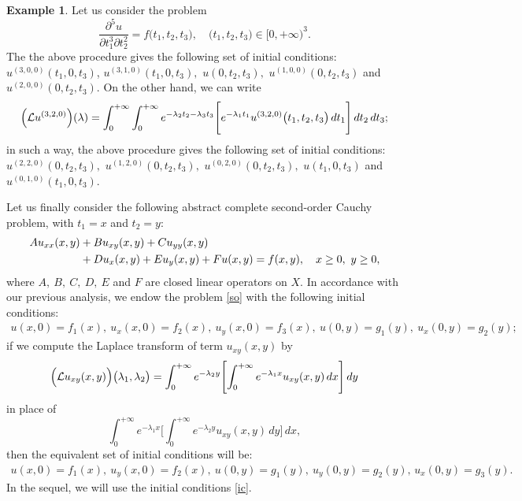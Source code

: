 \documentclass{amsart}
\theoremstyle{definition}
\newtheorem{example}[thm]{Example}
\theoremstyle{remark}
\numberwithin{equation}{section}
\begin{document}
\begin{example}\label{ill}
Let us consider the problem
$$
\frac{\partial^{5}u}{\partial t_{1}^{3}\partial t_{2}^{2}}=f\bigl(t_{1},t_{2},t_{3}\bigr),\quad \bigl(t_{1},t_{2},t_{3}\bigr) \in [0,+\infty)^{3}. 
$$
The the above procedure gives the following set of initial conditions: $u^{(3,0,0)}(t_{1},0,t_{3})$, $u^{(3,1,0)}(t_{1},0,t_{3}),$ $u(0,t_{2},t_{3}),$ $u^{(1,0,0)}(0,t_{2},t_{3})$ and $u^{(2,0,0)}(0,t_{2},t_{3}).$ On the other hand, we can write
$$
\Bigl({\mathcal L}u^{(3,2,0)}\Bigr)(\lambda)=\int^{+\infty}_{0}\int^{+\infty}_{0}e^{-\lambda_{2}t_{2}-\lambda_{3}t_{3}}\Biggl[ e^{-\lambda_{1}t_{1}}u^{(3,2,0)}\bigl(t_{1},t_{2},t_{3}\bigr)\, dt_{1}\Biggr]\, dt_{2}\, dt_{3};
$$
in such a way, the above procedure gives the following set of initial conditions: $u^{(2,2,0)}(0,t_{2},t_{3}),$ $u^{(1,2,0)}(0,t_{2},t_{3}),$ $u^{(0,2,0)}(0,t_{2},t_{3}),$ $u (t_{1},0,t_{3})$ and $u^{(0,1,0)} (t_{1},0,t_{3}).$
\end{example}

Let us finally consider the following abstract complete second-order Cauchy problem, with $t_{1}=x$ and $t_{2}=y$:
\begin{align}\notag
Au_{xx}(x,y)& +Bu_{xy}(x,y)+Cu_{yy}(x,y)
\\\label{so}& +Du_{x}(x,y)+Eu_{y}(x,y)+Fu(x,y)=f(x,y),\quad x\geq 0,\ y\geq0,
\end{align}
where $A,\ B,\ C,\ D,\ E$ and $F$ are closed linear operators on $X.$ In accordance with our previous analysis, we endow the problem \eqref{so} with the following initial conditions:
\begin{align}\label{ic}
u(x,0)=f_{1}(x),\   u_{x}(x,0)=f_{2}(x),\ u_{y}(x,0)=f_{3}(x),\ u(0,y)=g_{1}(y),\  u_{x}(0,y)=g_{2}(y);
\end{align}
if we compute the Laplace transform of term $u_{xy}(x,y)$ by
$$
\Bigl({\mathcal L}u_{xy}(x,y)\Bigr)\bigl( \lambda_{1},\lambda_{2} \bigr)=\int^{+\infty}_{0}e^{-\lambda_{2}y}\Biggl[ \int^{+\infty}_{0}e^{-\lambda_{1}x}u_{xy}(x,y)\, dx \Biggr]\, dy 
$$
in place of
$$
\int^{+\infty}_{0}e^{-\lambda_{1}x}\Biggl[ \int^{+\infty}_{0}e^{-\lambda_{2}y}u_{xy}(x,y)\, dy \Biggr]\, dx ,
$$
then the equivalent set of initial conditions will be:
\begin{align*} 
u(x,0)=f_{1}(x),\  u_{y}(x,0)=f_{2}(x),\ u(0,y)=g_{1}(y),\  u_{y}(0,y)=g_{2}(y),\, u_{x}(0,y)=g_{3}(y).
\end{align*}
In the sequel, we will use the initial conditions \eqref{ic}. 
\end{document}
